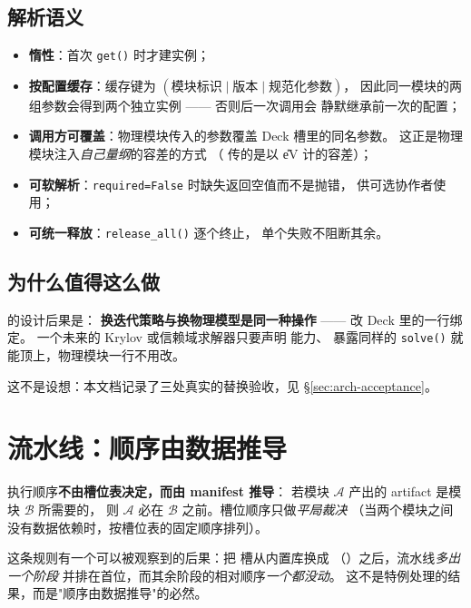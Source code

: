 \subsection{解析语义}

\begin{itemize}[leftmargin=1.7em,itemsep=0.28em,topsep=0.35em]
  \item \textbf{惰性}：首次 \texttt{get()} 时才建实例；
  \item \textbf{按配置缓存}：缓存键为
        $(\text{模块标识} \mid \text{版本} \mid \text{规范化参数})$，
        因此同一模块的两组参数会得到两个独立实例 —— 否则后一次调用会
        静默继承前一次的配置；
  \item \textbf{调用方可覆盖}：物理模块传入的参数覆盖 Deck 槽里的同名参数。
        这正是物理模块注入\emph{自己量纲}的容差的方式
        （ 传的是以 \U{eV} 计的容差）；
  \item \textbf{可软解析}：\texttt{required=False} 时缺失返回空值而不是抛错，
        供可选协作者使用；
  \item \textbf{可统一释放}：\texttt{release\_all()} 逐个终止，
        单个失败不阻断其余。
\end{itemize}

\subsection{为什么值得这么做}

 的设计后果是：
\textbf{换迭代策略与换物理模型是同一种操作} —— 改 Deck 里的一行绑定。
一个未来的 Krylov 或信赖域求解器只要声明  能力、
暴露同样的 \texttt{solve()} 就能顶上，物理模块一行不用改。

这不是设想：本文档记录了三处真实的替换验收，见 \S\ref{sec:arch-acceptance}。

\section{流水线：顺序由数据推导}
\label{sec:arch-pipeline}

执行顺序\textbf{不由槽位表决定，而由 manifest 推导}：
若模块 $\mathcal{A}$ 产出的 artifact 是模块 $\mathcal{B}$ 所需要的，
则 $\mathcal{A}$ 必在 $\mathcal{B}$ 之前。槽位顺序只做\emph{平局裁决}
（当两个模块之间没有数据依赖时，按槽位表的固定顺序排列）。

这条规则有一个可以被观察到的后果：把  槽从内置库换成
（）之后，流水线\emph{多出一个阶段}
并排在首位，而其余阶段的相对顺序\emph{一个都没动}。
这不是特例处理的结果，而是"顺序由数据推导"的必然。

